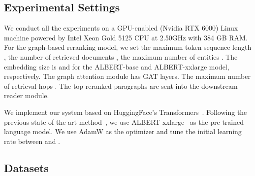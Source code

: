 \documentclass[sigconf]{acmart}
\begin{document}
\subsection{Experimental Settings} \label{graph-base reranking setting}
We conduct all the experiments on a GPU-enabled (Nvidia RTX 6000) Linux machine powered by Intel Xeon Gold 5125 CPU at 2.50GHz with 384 GB RAM. For the graph-based reranking model, we set the maximum token sequence length , the number of retrieved documents , the maximum number of entities . The embedding size  is  and  for the ALBERT-base and ALBERT-xxlarge model, respectively. The graph attention module has  GAT layers. The maximum number of retrieval hops . The top  reranked paragraphs are sent into the downstream reader module.

We implement our system based on HuggingFace's Transformers~\citep{Wolf2019HuggingFacesTS}. Following the previous state-of-the-art method~\cite{Fang2019HierarchicalGN}, we use ALBERT-xxlarge~\citep{Lan2020ALBERT:} as the pre-trained language model. We use AdamW \citep{Wolf2019HuggingFacesTS} as the optimizer and tune the initial learning rate between  and .


\subsection{Datasets} \label{appdx:data}
\end{document}
